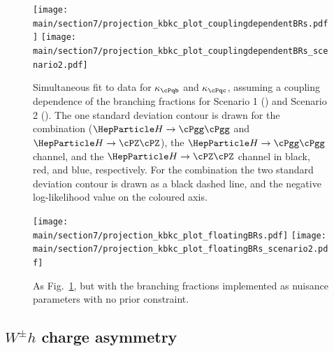 \documentclass[../report.tex]{subfiles}
\providecommand{\main}{..}
\newcommand{\hboson}{\ensuremath{\PH}\xspace}
\newcommand{\bquark}{\ensuremath{\cPqb}\xspace}
\newcommand{\cquark}{\ensuremath{\cPqc}\xspace}
\newcommand{\zboson}{\ensuremath{\cPZ}\xspace}
\newcommand{\photon}{\ensuremath{\cPgg}\xspace}
\newcommand{\hgg}{\ensuremath{\hboson\to\photon\photon}\xspace}
\newcommand{\hzz}{\ensuremath{\hboson\to\zboson\zboson}\xspace}
\newcommand{\kappab}{\ensuremath{\kappa_{\bquark}}\xspace}
\newcommand{\kappac}{\ensuremath{\kappa_{\cquark}}\xspace}
\begin{document}
\begin{figure}[hbtp]
  \begin{center}
    \texttt{[image: \\main/section7/projection\_kbkc\_plot\_couplingdependentBRs.pdf]}
    \texttt{[image: \\main/section7/projection\_kbkc\_plot\_couplingdependentBRs\_scenario2.pdf]}
    \caption{
        Simultaneous fit to data for $\kappab$ and $\kappac$, assuming a coupling dependence of the branching fractions for Scenario 1 (\cmsLeft) and Scenario 2 (\cmsRight).
        The one standard deviation contour is drawn for the combination ($\hgg$ and $\hzz$), the $\hgg$ channel, and the $\hzz$ channel in black, red, and blue, respectively.
        For the combination the two standard deviation contour is drawn as a black dashed line, and the negative log-likelihood value on the coloured axis.
        }
    \label{fig:kbkc_couplingdependentBRs}
  \end{center}
\end{figure}

\begin{figure}[hbtp]
  \begin{center}
    \texttt{[image: \\main/section7/projection\_kbkc\_plot\_floatingBRs.pdf]}
    \texttt{[image: \\main/section7/projection\_kbkc\_plot\_floatingBRs\_scenario2.pdf]}
    \caption{
        As Fig.~\ref{fig:kbkc_couplingdependentBRs}, but with the branching fractions implemented as nuisance parameters with no prior constraint.
        }
    \label{fig:kbkc_floatingBRs}
  \end{center}
\end{figure}


\subsection{$W^\pm h$ charge asymmetry}
\end{document}
